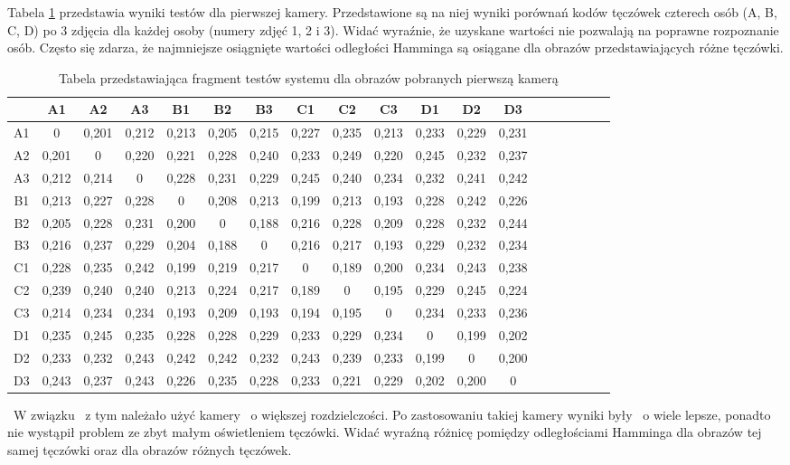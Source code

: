 Tabela \ref{tab:pierwsza} przedstawia wyniki testów dla pierwszej kamery. Przedstawione są na niej wyniki porównań kodów tęczówek czterech osób (A, B, C, D) po 3 zdjęcia dla każdej osoby (numery zdjęć 1, 2 i 3). Widać wyraźnie, że uzyskane wartości nie pozwalają na poprawne rozpoznanie osób. Często się zdarza, że najmniejsze osiągnięte wartości odległości Hamminga są osiągane dla obrazów przedstawiających różne tęczówki.

\begin{table}
\caption{Tabela przedstawiająca fragment testów systemu dla obrazów pobranych pierwszą kamerą}
\label{tab:pierwsza}
\begin{tabular}{|c|c|c|c|c|c|c|c|c|c|c|c|c|c|c|c|c|c|c|}
\hline
 & A1 & A2 & A3 & B1 & B2 & B3 & C1 & C2 & C3 & D1 & D2 & D3\\ \hline
A1 & 0&0,201&0,212&0,213&0,205&0,215&0,227&0,235&0,213&0,233&0,229&0,231 \\ \hline
A2 & 0,201&0&0,220&0,221&0,228&0,240&0,233&0,249&0,220&0,245&0,232&0,237 \\ \hline
A3 & 0,212&0,214&0&0,228&0,231&0,229&0,245&0,240&0,234&0,232&0,241&0,242\\ \hline
B1 & 0,213&0,227&0,228&0&0,208&0,213&0,199&0,213&0,193&0,228&0,242&0,226\\ \hline
B2 & 0,205&0,228&0,231&0,200&0&0,188&0,216&0,228&0,209&0,228&0,232&0,244\\ \hline
B3 & 0,216&0,237&0,229&0,204&0,188&0&0,216&0,217&0,193&0,229&0,232&0,234\\ \hline
C1 & 0,228&0,235&0,242&0,199&0,219&0,217&0&0,189&0,200&0,234&0,243&0,238\\ \hline
C2 & 0,239&0,240&0,240&0,213&0,224&0,217&0,189&0&0,195&0,229&0,245&0,224\\ \hline
C3 & 0,214&0,234&0,234&0,193&0,209&0,193&0,194&0,195&0&0,234&0,233&0,236\\ \hline
D1 & 0,235&0,245&0,235&0,228&0,228&0,229&0,233&0,229&0,234&0&0,199&0,202\\ \hline
D2 & 0,233&0,232&0,243&0,242&0,242&0,232&0,243&0,239&0,233&0,199&0&0,200\\ \hline
D3 & 0,243&0,237&0,243&0,226&0,235&0,228&0,233&0,221&0,229&0,202&0,200&0\\ \hline
\end{tabular}
\end{table}

~W związku ~z tym należało użyć kamery ~o większej rozdzielczości. Po zastosowaniu takiej kamery wyniki były ~o wiele lepsze, ponadto nie wystąpił problem ze zbyt małym oświetleniem tęczówki. Widać wyraźną różnicę pomiędzy odległościami Hamminga dla obrazów tej samej tęczówki oraz dla obrazów różnych tęczówek.

